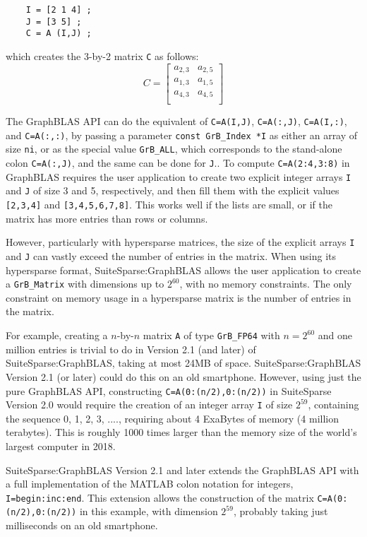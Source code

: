 \documentclass[12pt]{article}
\begin{document}
{    {\footnotesize
    \begin{verbatim}
    I = [2 1 4] ;
    J = [3 5] ;
    C = A (I,J) ; \end{verbatim} }
\noindent
which creates the 3-by-2 matrix \verb'C' as follows:
\[
C =
\left[
\begin{array}{cc}
a_{2,3} & a_{2,5} \\
a_{1,3} & a_{1,5} \\
a_{4,3} & a_{4,5} \\
\end{array}
\right]
\]

The GraphBLAS API can do the equivalent of \verb'C=A(I,J)',
\verb'C=A(:,J)', \verb'C=A(I,:)', and \verb'C=A(:,:)', by passing a parameter
\verb'const GrB_Index *I' as either an array of size \verb'ni', or as the
special value \verb'GrB_ALL', which corresponds to the stand-alone colon
\verb'C=A(:,J)', and the same can be done for \verb'J'..  To compute
\verb'C=A(2:4,3:8)' in GraphBLAS requires the user application to create two
explicit integer arrays \verb'I' and \verb'J' of size 3 and 5, respectively,
and then fill them with the explicit values \verb'[2,3,4]' and
\verb'[3,4,5,6,7,8]'.  This works well if the lists are small, or if the matrix
has more entries than rows or columns.

However, particularly with hypersparse matrices, the size of the explicit
arrays \verb'I' and \verb'J' can vastly exceed the number of entries in the
matrix.  When using its hypersparse format, SuiteSparse:GraphBLAS allows the
user application to create a \verb'GrB_Matrix' with dimensions up to $2^{60}$,
with no memory constraints.  The only constraint on memory usage in a
hypersparse matrix is the number of entries in the matrix.

For example, creating a $n$-by-$n$ matrix \verb'A' of type \verb'GrB_FP64' with
$n=2^{60}$ and one million entries is trivial to do in Version 2.1 (and later)
of SuiteSparse:GraphBLAS, taking at most 24MB of space.  SuiteSparse:GraphBLAS
Version 2.1 (or later) could do this on an old smartphone.  However, using just
the pure GraphBLAS API, constructing \verb'C=A(0:(n/2),0:(n/2))'
in SuiteSparse Version 2.0 would require the creation of an integer array
\verb'I' of size $2^{59}$, containing the sequence 0, 1, 2, 3, ...., requiring
about 4 ExaBytes of memory (4 million terabytes).  This is roughly 1000 times
larger than the memory size of the world's largest computer in 2018.

SuiteSparse:GraphBLAS Version 2.1 and later extends the GraphBLAS API with a
full implementation of the MATLAB colon notation for integers,
\verb'I=begin:inc:end'.  This extension allows the construction of the matrix
\verb'C=A(0:(n/2),0:(n/2))' in this example, with dimension $2^{59}$, probably
taking just milliseconds on an old smartphone.

}
\end{document}

